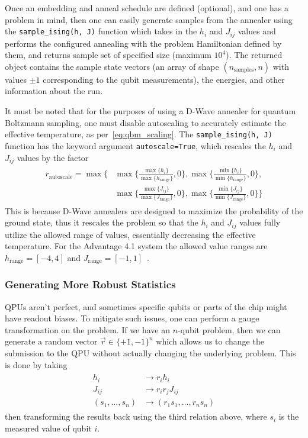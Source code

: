 Once an embedding and anneal schedule are defined (optional), and one has a problem in mind, then one can easily generate samples from the annealer using the \texttt{sample\_ising(h, J)} function which takes in the \( h_i \) and \( J_{ij} \) values and performs the configured annealing with the problem Hamiltonian defined by them, and returns sample set of specified size (maximum \( 10^4 \)).
The returned object contains the sample state vectors (an array of shape \( (n_\text{samples}, n) \) with values \( \pm 1 \) corresponding to the qubit measurements), the energies, and other information about the run.

It must be noted that for the purposes of using a D-Wave annealer for quantum Boltzmann sampling, one must disable autoscaling to accurately estimate the effective temperature, as per~\cref{eq:qbm_scaling}.
The \texttt{sample\_ising(h, J)} function has the keyword argument \texttt{autoscale=True}, which rescales the \( h_i \) and \( J_{ij} \) values by the factor~\cite{dwave_solver_parameters}
\begin{align}
\begin{split}
    r_\text{autoscale}
        = \max\Bigg\{
            &\max\bigg\{\frac{\max\{h_i\}}{\max\{h_\text{range}\}},0\bigg\},
            \max\bigg\{\frac{\min\{h_i\}}{\min\{h_\text{range}\}},0\bigg\}, \\
            &\max\bigg\{\frac{\max\{J_{ij}\}}{\max\{J_\text{range}\}},0\bigg\},
            \max\bigg\{\frac{\min\{J_{ij}\}}{\min\{J_\text{range}\}},0\bigg\}
        \Bigg\}
\end{split}
\end{align}
This is because D-Wave annealers are designed to maximize the probability of the ground state, thus it rescales the problem so that the \( h_i \) and \( J_{ij} \) values fully utilize the allowed range of values, essentially decreasing the effective temperature.
For the Advantage 4.1 system the allowed value ranges are \( h_\text{range} = [-4, 4] \) and \( J_\text{range} = [-1, 1] \)~\cite{dwave_solver_properties}.

\subsubsection{Generating More Robust Statistics}
QPUs aren't perfect, and sometimes specific qubits or parts of the chip might have readout biases.
To mitigate such issues, one can perform a gauge transformation on the problem.
If we have an \( n \)-qubit problem, then we can generate a random vector \( \vec{r} \in \{+1, -1\}^n \) which allows us to change the submission to the QPU without actually changing the underlying problem.
This is done by taking
\begin{align}
\begin{split}
    h_i
        &\rightarrow r_i h_i \\
    J_{ij}
        &\rightarrow r_i r_j J_{ij} \\
    (s_1, \dots, s_n)
        &\rightarrow (r_1 s_1, \dots, r_n s_n)
\end{split}
\end{align}
then transforming the results back using the third relation above, where \( s_i \) is the measured value of qubit \( i \).

